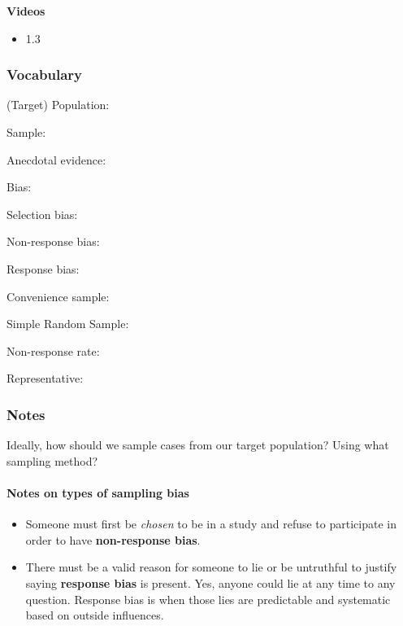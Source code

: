 \documentclass[
]{report}
\providecommand{\tightlist}{%
  \setlength{\itemsep}{0pt}\setlength{\parskip}{0pt}}
\newcommand{\rgs}{\vspace{12pt}} %
\newcommand{\rgi}{\hspace{24pt}}  %
\begin{document}
\textbf{Videos}

\begin{itemize}
\tightlist
\item
  1.3
\end{itemize}


\hypertarget{vocabulary-1}{%
\subsubsection*{Vocabulary}\label{vocabulary-1}}

(Target) Population:
\rgs

Sample:
\rgs

Anecdotal evidence:
\rgs

Bias:
\rgs

\rgi Selection bias:
\rgs

\rgi Non-response bias:
\rgs

\rgi Response bias:
\rgs

Convenience sample:
\rgs

Simple Random Sample:
\rgs

Non-response rate:
\rgs

Representative:
\rgs

\hypertarget{notes-1}{%
\subsubsection*{Notes}\label{notes-1}}

Ideally, how should we sample cases from our target population? Using what sampling method?
\rgs

\hypertarget{notes-on-types-of-sampling-bias}{%
\paragraph*{Notes on types of sampling bias}\label{notes-on-types-of-sampling-bias}}

\begin{itemize}
\item
  Someone must first be \emph{chosen} to be in a study and refuse to participate in order to have \textbf{non-response bias}.
\item
  There must be a valid reason for someone to lie or be untruthful to justify saying \textbf{response bias} is present. Yes, anyone could lie at any time to any question. Response bias is when those lies are predictable and systematic based on outside influences.
  \rgs
\end{itemize}
\end{document}
